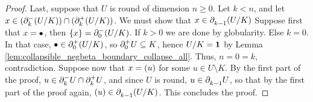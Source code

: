 \begin{proof}
    Last, suppose that \( U \) is round of dimension \( n \geq 0 \).
    Let \( k < n \), and let \( x \in (\bd{k}{-} (\coll{K}{U})) \cap (\bd{k}{+} (\coll{K}{U})) \).
    We must show that \( x \in \bd{k - 1}{}  (\coll{K}{U}) \)
    Suppose first that \( x = \zcoll \), then \( \set{x} = \bd{0}{-} (\coll{K}{U}) \).
    If \( k > 0 \) we are done by globularity.
    Else \( k = 0 \).
    In that case, \( \zcoll \in \bd{0}{+} (\coll{K}{U}) \), so \( \bd{0}{+} U \subseteq K \), hence \( \coll{K}{U} = \pt \) by Lemma \ref{lem:collapsible_negbeta_boundary_collapse_all}.
    Thus, \( n = 0 = k \), contradiction.
    Suppose now that \( x = \icoll{u} \) for some \( u \in U \setminus K \).
    By the first part of the proof, \( u \in \bd{k}{-} U \cap \bd{k}{+} U \), and since \( U \) is round, \( u \in \bd{k - 1}{} U \), so that by the first part of the proof again, \( \icoll{u} \in \bd{k - 1}{} (\coll{K}{U}) \).
    This concludes the proof.
\end{proof}

